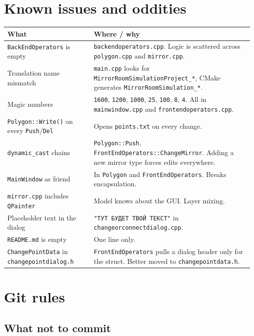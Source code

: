 \documentclass[a4paper,11pt]{article}
\newcommand{\file}[1]{\texttt{#1}}
\newcommand{\code}[1]{\texttt{#1}}
\begin{document}
\section{Known issues and oddities}
\label{sec:known-issues}

\begin{longtable}{@{}p{6.5cm}p{8cm}@{}}
\toprule
\textbf{What} & \textbf{Where / why} \\ \midrule
\endhead
\code{BackEndOperators} is empty &
\file{backendoperators.cpp}. Logic is scattered across
\file{polygon.cpp} and \file{mirror.cpp}. \\
\addlinespace
Translation name mismatch &
\file{main.cpp} looks for \code{MirrorRoomSimulationProject\_*},
CMake generates \code{MirrorRoomSimulation\_*}. \\
\addlinespace
Magic numbers &
\code{1600}, \code{1200}, \code{1000}, \code{25}, \code{100},
\code{8}, \code{4}. All in \file{mainwindow.cpp} and
\file{frontendoperators.cpp}. \\
\addlinespace
\code{Polygon::Write()} on every \code{Push}/\code{Del} &
Opens \file{points.txt} on every change. \\
\addlinespace
\code{dynamic\_cast} chains &
\code{Polygon::Push}, \code{FrontEndOperators::ChangeMirror}. Adding
a new mirror type forces edits everywhere. \\
\addlinespace
\code{MainWindow} as friend & In \code{Polygon} and
\code{FrontEndOperators}. Breaks encapsulation. \\
\addlinespace
\code{mirror.cpp} includes \code{QPainter} &
Model knows about the GUI. Layer mixing. \\
\addlinespace
Placeholder text in the dialog &
\code{"ТУТ БУДЕТ ТВОЙ ТЕКСТ"} in
\file{changeorconnectdialog.cpp}. \\
\addlinespace
\file{README.md} is empty & One line only. \\
\addlinespace
\code{ChangePointData} in \file{changepointdialog.h} &
\code{FrontEndOperators} pulls a dialog header only for the struct.
Better moved to \file{changepointdata.h}. \\
\bottomrule
\end{longtable}

\section{Git rules}
\label{sec:git}

\subsection{What not to commit}
\end{document}
